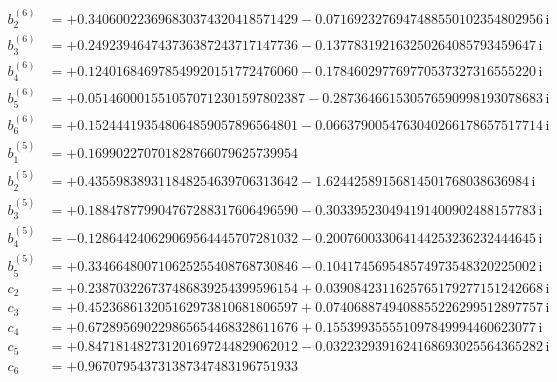 {\begin{align*}
b^{(6)}_{2} &= +0.340600223696830374320418571429 - 0.0716923276947488550102354802956\,\mathrm{i}\\
b^{(6)}_{3} &= +0.249239464743736387243717147736 - 0.137783192163250264085793459647\,\mathrm{i}\\
b^{(6)}_{4} &= +0.124016846978549920151772476060 - 0.178460297769770537327316555220\,\mathrm{i}\\
b^{(6)}_{5} &= +0.0514600015510570712301597802387 - 0.287364661530576590998193078683\,\mathrm{i}\\
b^{(6)}_{6} &= +0.152444193548064859057896564801 - 0.0663790054763040266178657517714\,\mathrm{i}\\[1mm]
b^{(5)}_{1} &= +0.169902270701828766079625739954\\
b^{(5)}_{2} &= +0.435598389311848254639706313642 - 1.62442589156814501768038636984\,\mathrm{i}\\
b^{(5)}_{3} &= +0.188478779904767288317606496590 - 0.303395230494191400902488157783\,\mathrm{i}\\
b^{(5)}_{4} &= -0.128644240629069564445707281032 - 0.200760033064144253236232444645\,\mathrm{i}\\
b^{(5)}_{5} &= +0.334664800710625255408768730846 - 0.104174569548574973548320225002\,\mathrm{i}\\[1mm]
c_{2} &= +0.238703226737486839254399596154 + 0.0390842311625765179277151242668\,\mathrm{i}\\
c_{3} &= +0.452368613205162973810681806597 + 0.0740688749408855226299512897757\,\mathrm{i}\\
c_{4} &= +0.672895690229865654468328611676 + 0.155399355551097849994460623077\,\mathrm{i}\\
c_{5} &= +0.847181482731201697244829062012 - 0.0322329391624168693025564365282\,\mathrm{i}\\
c_{6} &= +0.967079543731387347483196751933
\end{align*}
}

